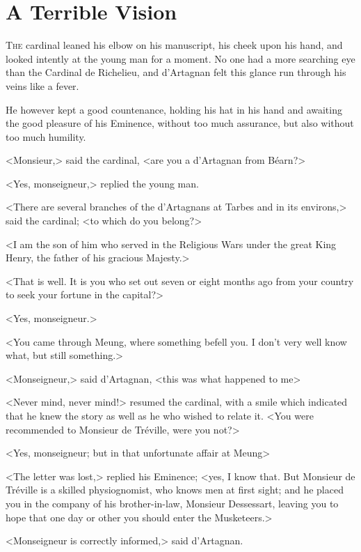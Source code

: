 
\chapter{A Terrible Vision}

\lettrine[]{T}{he} cardinal leaned his elbow on his manuscript, his cheek upon his hand, and looked intently at the young man for a moment. No one had a more searching eye than the Cardinal de Richelieu, and d'Artagnan felt this glance run through his veins like a fever. 

He however kept a good countenance, holding his hat in his hand and awaiting the good pleasure of his Eminence, without too much assurance, but also without too much humility. 

<Monsieur,> said the cardinal, <are you a d'Artagnan from Béarn?> 

<Yes, monseigneur,> replied the young man. 

<There are several branches of the d'Artagnans at Tarbes and in its environs,> said the cardinal; <to which do you belong?> 

<I am the son of him who served in the Religious Wars under the great King Henry, the father of his gracious Majesty.> 

<That is well. It is you who set out seven or eight months ago from your country to seek your fortune in the capital?> 

<Yes, monseigneur.> 

<You came through Meung, where something befell you. I don't very well know what, but still something.> 

<Monseigneur,> said d'Artagnan, <this was what happened to me\longdash> 

<Never mind, never mind!> resumed the cardinal, with a smile which indicated that he knew the story as well as he who wished to relate it. <You were recommended to Monsieur de Tréville, were you not?> 

<Yes, monseigneur; but in that unfortunate affair at Meung\longdash> 

<The letter was lost,> replied his Eminence; <yes, I know that. But Monsieur de Tréville is a skilled physiognomist, who knows men at first sight; and he placed you in the company of his brother-in-law, Monsieur Dessessart, leaving you to hope that one day or other you should enter the Musketeers.> 

<Monseigneur is correctly informed,> said d'Artagnan. 

